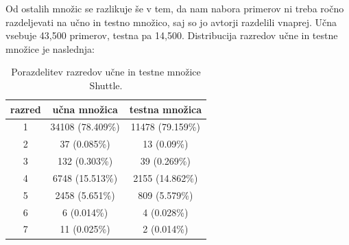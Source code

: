 \documentclass[a4paper,12pt,openright]{book}
\begin{document}
    Od ostalih množic se razlikuje še v tem, da nam nabora primerov ni treba ročno razdeljevati na učno in testno
    množico, saj so jo avtorji razdelili vnaprej.
    Učna vsebuje 43,500 primerov, testna pa 14,500.
    Distribucija razredov učne in testne množice je naslednja:
    \begin{table}[H]
        \centering
        \begin{tabular}{||c c c||}
            \hline
            razred & učna množica     & testna množica \\ [0.5ex]
            \hline
            1      & 34108 (78.409\%) & 11478 (79.159\%) \\
            \hline
            2      & 37 (0.085\%)     & 13 (0.09\%)      \\
            \hline
            3      & 132 (0.303\%)    & 39 (0.269\%)     \\
            \hline
            4      & 6748 (15.513\%)  & 2155 (14.862\%)  \\
            \hline
            5      & 2458 (5.651\%)   & 809 (5.579\%)    \\
            \hline
            6      & 6 (0.014\%)      & 4 (0.028\%)      \\
            \hline
            7      & 11 (0.025\%)     & 2 (0.014\%)      \\
            \hline
        \end{tabular}
        \caption{Porazdelitev razredov učne in testne množice Shuttle.}
        \label{tab:shuttle_opis}
    \end{table}

    \newpage
\end{document}
